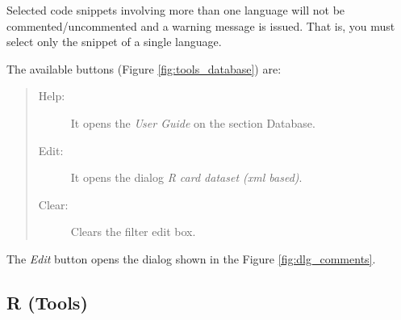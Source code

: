 Selected code snippets involving more than one language will not be commented/uncommented
and a warning message is issued. That is, you must select only the snippet of a single language.

The available buttons
(Figure \ref{fig:tools_database})
are:

\begin{quote}
  \begin{footnotesize}
    \begin{description}
      \item[Help:]
        It opens the \textit{User Guide} on the section Database.
      \item[Edit:]
        It opens the dialog \textit{R card dataset (xml based)}.
      \item [Clear:]
        Clears the filter edit box.
    \end{description}
  \end{footnotesize}
\end{quote}

The \textit{Edit} button opens the dialog shown in the Figure \ref{fig:dlg_comments}.


\hypertarget{working_tools_r}{}
\subsection{R (Tools)}

